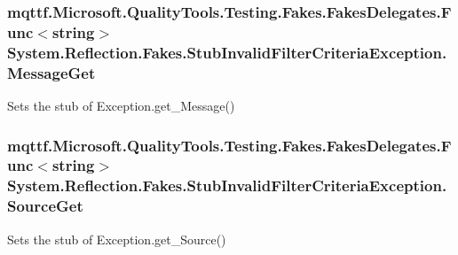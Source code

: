 \hypertarget{class_system_1_1_reflection_1_1_fakes_1_1_stub_invalid_filter_criteria_exception_a6fe3fb396657fd7805ad87f6e830bf0c}{
\subsubsection[{Message\-Get}]{\setlength{\rightskip}{0pt plus 5cm}mqttf.\-Microsoft.\-Quality\-Tools.\-Testing.\-Fakes.\-Fakes\-Delegates.\-Func$<$string$>$ System.\-Reflection.\-Fakes.\-Stub\-Invalid\-Filter\-Criteria\-Exception.\-Message\-Get}}\label{class_system_1_1_reflection_1_1_fakes_1_1_stub_invalid_filter_criteria_exception_a6fe3fb396657fd7805ad87f6e830bf0c}


Sets the stub of Exception.\-get\-\_\-\-Message()

\hypertarget{class_system_1_1_reflection_1_1_fakes_1_1_stub_invalid_filter_criteria_exception_a2848c5adc5e463d14544113c5509a671}{
\subsubsection[{Source\-Get}]{\setlength{\rightskip}{0pt plus 5cm}mqttf.\-Microsoft.\-Quality\-Tools.\-Testing.\-Fakes.\-Fakes\-Delegates.\-Func$<$string$>$ System.\-Reflection.\-Fakes.\-Stub\-Invalid\-Filter\-Criteria\-Exception.\-Source\-Get}}\label{class_system_1_1_reflection_1_1_fakes_1_1_stub_invalid_filter_criteria_exception_a2848c5adc5e463d14544113c5509a671}


Sets the stub of Exception.\-get\-\_\-\-Source()

